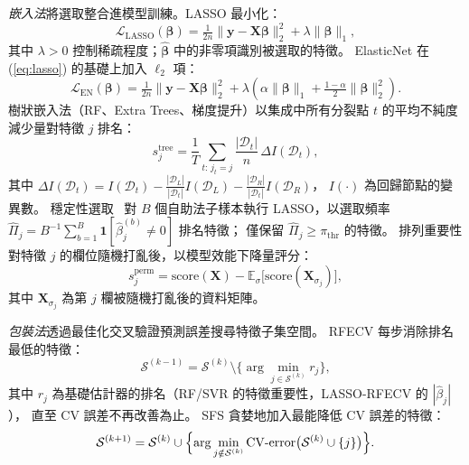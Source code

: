 \documentclass[12pt, a4paper]{article}
\begin{document}
\emph{嵌入法}將選取整合進模型訓練。LASSO 最小化：
\begin{equation}
    \mathcal{L}_{\mathrm{LASSO}}(\boldsymbol{\beta})
    = \tfrac{1}{2n}\|\mathbf{y} - \mathbf{X}\boldsymbol{\beta}\|_2^2
    + \lambda\|\boldsymbol{\beta}\|_1,
    \label{eq:lasso}
\end{equation}
其中 $\lambda > 0$ 控制稀疏程度；$\hat{\boldsymbol{\beta}}$ 中的非零項識別被選取的特徵。
ElasticNet 在 (\ref{eq:lasso}) 的基礎上加入 $\ell_2$ 項：
\begin{equation}
    \mathcal{L}_{\mathrm{EN}}(\boldsymbol{\beta})
    = \tfrac{1}{2n}\|\mathbf{y} - \mathbf{X}\boldsymbol{\beta}\|_2^2
    + \lambda\!\left(\alpha\|\boldsymbol{\beta}\|_1
      + \tfrac{1-\alpha}{2}\|\boldsymbol{\beta}\|_2^2\right).
    \label{eq:elasticnet}
\end{equation}
樹狀嵌入法（RF、Extra Trees、梯度提升）以集成中所有分裂點 $t$ 的平均不純度減少量對特徵 $j$ 排名：
\begin{equation}
    s_j^{\mathrm{tree}} = \frac{1}{T}\sum_{t:\,j_t=j}
        \frac{|\mathcal{D}_t|}{n}\,\Delta I(\mathcal{D}_t),
    \label{eq:impurity}
\end{equation}
其中 $\Delta I(\mathcal{D}_t) = I(\mathcal{D}_t)
  - \tfrac{|\mathcal{D}_L|}{|\mathcal{D}_t|}I(\mathcal{D}_L)
  - \tfrac{|\mathcal{D}_R|}{|\mathcal{D}_t|}I(\mathcal{D}_R)$，
$I(\cdot)$ 為回歸節點的變異數。
穩定性選取~\cite{Meinshausen2009} 對 $B$ 個自助法子樣本執行 LASSO，以選取頻率
$\hat{\Pi}_j = B^{-1}\sum_{b=1}^{B}\mathbf{1}[\hat{\beta}_j^{(b)}\neq 0]$ 排名特徵；
僅保留 $\hat{\Pi}_j \geq \pi_{\mathrm{thr}}$ 的特徵。
排列重要性對特徵 $j$ 的欄位隨機打亂後，以模型效能下降量評分：
\begin{equation}
    s_j^{\mathrm{perm}} = \mathrm{score}(\mathbf{X})
        - \mathbb{E}_{\sigma}\bigl[\mathrm{score}(\mathbf{X}_{\sigma_j})\bigr],
    \label{eq:permutation}
\end{equation}
其中 $\mathbf{X}_{\sigma_j}$ 為第 $j$ 欄被隨機打亂後的資料矩陣。

\emph{包裝法}透過最佳化交叉驗證預測誤差搜尋特徵子集空間。
RFECV 每步消除排名最低的特徵：
\begin{equation}
    \mathcal{S}^{(k-1)} = \mathcal{S}^{(k)}
        \setminus \bigl\{\arg\min_{j\in\mathcal{S}^{(k)}} r_j\bigr\},
    \label{eq:rfecv}
\end{equation}
其中 $r_j$ 為基礎估計器的排名（RF/SVR 的特徵重要性，LASSO-RFECV 的 $|\hat{\beta}_j|$），
直至 CV 誤差不再改善為止。
SFS 貪婪地加入最能降低 CV 誤差的特徵：
\begin{equation}
    \mathcal{S}^{(k+1)} = \mathcal{S}^{(k)} \cup
        \Bigl\{\arg\min_{j\notin\mathcal{S}^{(k)}}
            \mathrm{CV\text{-}error}\bigl(\mathcal{S}^{(k)}\cup\{j\}\bigr)\Bigr\}.
    \label{eq:sfs}
\end{equation}
\end{document}
